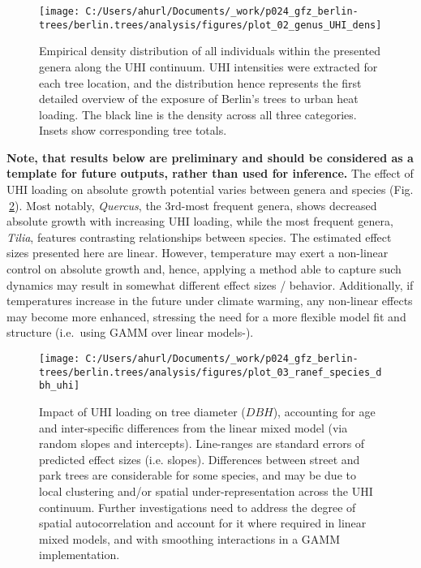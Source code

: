 \documentclass[
]{article}
\begin{document}
\begin{figure}

{\centering \texttt{[image: C:/Users/ahurl/Documents/\_work/p024\_gfz\_berlin-trees/berlin.trees/analysis/figures/plot\_02\_genus\_UHI\_dens]} 

}

\caption{Empirical density distribution of all individuals within the presented genera along the UHI continuum. UHI intensities were extracted for each tree location, and the distribution hence represents the first detailed overview of the exposure of Berlin's trees to urban heat loading. The black line is the density across all three categories. Insets show corresponding tree totals.}\label{fig:fig-density}
\end{figure}

\textbf{Note, that results below are preliminary and should be considered as a template for future outputs, rather than used for inference.}
The effect of UHI loading on absolute growth potential varies between genera and species (Fig.\(~\)\ref{fig:fig-lmestat}).
Most notably, \emph{Quercus}, the 3rd-most frequent genera, shows decreased absolute growth with increasing UHI loading,
while the most frequent genera, \emph{Tilia}, features contrasting relationships between species.
The estimated effect sizes presented here are linear.
However, temperature may exert a non-linear control on absolute growth and, hence, applying a method able to capture such dynamics may result in somewhat different effect sizes / behavior.
Additionally, if temperatures increase in the future under climate warming, any non-linear effects may become more enhanced, stressing the need for a more flexible model fit and structure (i.e.~using GAMM over linear models-).

\begin{figure}

{\centering \texttt{[image: C:/Users/ahurl/Documents/\_work/p024\_gfz\_berlin-trees/berlin.trees/analysis/figures/plot\_03\_ranef\_species\_dbh\_uhi]} 

}

\caption{Impact of UHI loading on tree diameter (\(DBH\)), accounting for age and inter-specific differences from the linear mixed model (via random slopes and intercepts). Line-ranges are standard errors of predicted effect sizes (i.e. slopes). Differences between street and park trees are considerable for some species, and may be due to local clustering and/or spatial under-representation across the UHI continuum. Further investigations need to address the degree of spatial autocorrelation and account for it where required in linear mixed models, and with smoothing interactions in a GAMM implementation.}\label{fig:fig-lmestat}
\end{figure}
\end{document}
